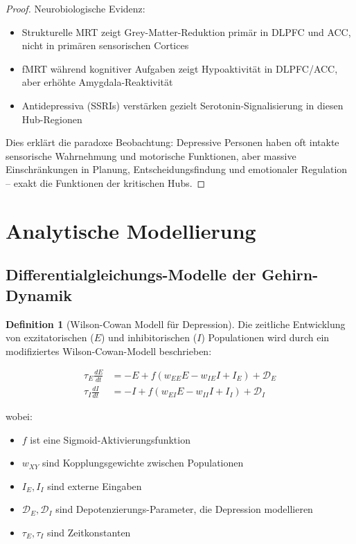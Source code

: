 \documentclass[a4paper,12pt]{article}
\theoremstyle{definition}
\newtheorem{definition}{Definition}
\begin{document}
\begin{proof}
Neurobiologische Evidenz:
\begin{itemize}
	\item Strukturelle MRT zeigt Grey-Matter-Reduktion primär in DLPFC und ACC, nicht in primären sensorischen Cortices \cite{campbell2004}
	\item fMRT während kognitiver Aufgaben zeigt Hypoaktivität in DLPFC/ACC, aber erhöhte Amygdala-Reaktivität \cite{drevets2008}
	\item Antidepressiva (SSRIs) verstärken gezielt Serotonin-Signalisierung in diesen Hub-Regionen
\end{itemize}

Dies erklärt die paradoxe Beobachtung: Depressive Personen haben oft intakte sensorische Wahrnehmung und motorische Funktionen, aber massive Einschränkungen in Planung, Entscheidungsfindung und emotionaler Regulation -- exakt die Funktionen der kritischen Hubs.
\end{proof}

\section{Analytische Modellierung}

\subsection{Differentialgleichungs-Modelle der Gehirn-Dynamik}

\begin{definition}[Wilson-Cowan Modell für Depression]
Die zeitliche Entwicklung von exzitatorischen ($E$) und inhibitorischen ($I$) Populationen wird durch ein modifiziertes Wilson-Cowan-Modell beschrieben:

\begin{align}
\tau_E \frac{dE}{dt} &= -E + f(w_{EE} E - w_{IE} I + I_E) + \mathcal{D}_E \\
\tau_I \frac{dI}{dt} &= -I + f(w_{EI} E - w_{II} I + I_I) + \mathcal{D}_I
\end{align}

wobei:
\begin{itemize}
	\item $f$ ist eine Sigmoid-Aktivierungsfunktion
	\item $w_{XY}$ sind Kopplungsgewichte zwischen Populationen
	\item $I_E, I_I$ sind externe Eingaben
	\item $\mathcal{D}_E, \mathcal{D}_I$ sind Depotenzierungs-Parameter, die Depression modellieren
	\item $\tau_E, \tau_I$ sind Zeitkonstanten
\end{itemize}
\end{definition}
\end{document}
